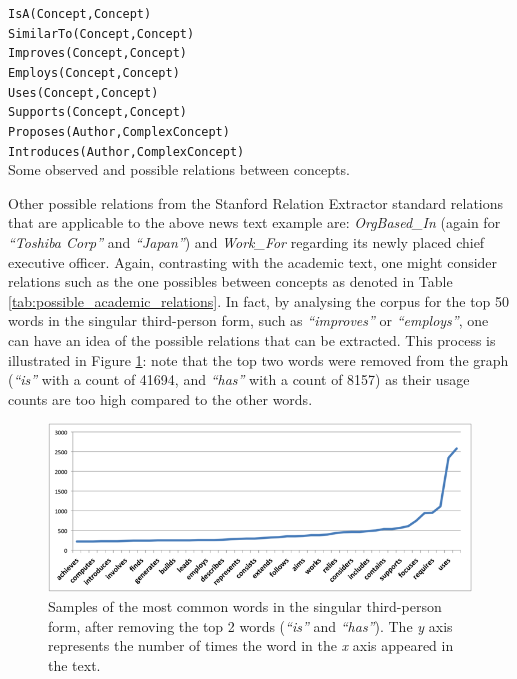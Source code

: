 \documentclass[11pt,a4paper,openright]{memoir}
\begin{document}
\begin{table}[!htbp]
  \centering
  \RaggedRight
    \texttt{IsA(Concept,Concept)} \\
    \texttt{SimilarTo(Concept,Concept)} \\
    \texttt{Improves(Concept,Concept)} \\
    \texttt{Employs(Concept,Concept)} \\
    \texttt{Uses(Concept,Concept)} \\
    \texttt{Supports(Concept,Concept)} \\
    \texttt{Proposes(Author,ComplexConcept)} \\
    \texttt{Introduces(Author,ComplexConcept)} \\
  \caption[Some observed and possible relations between concepts.]{Some observed and possible relations between concepts.}
  \label{tab:possible_academic_relations}
\end{table}

Other possible relations from the Stanford Relation Extractor standard relations that are applicable to the above news text example are: \emph{OrgBased\_In} (again for \emph{\enquote{Toshiba Corp}} and \emph{\enquote{Japan}}) and \emph{Work\_For} regarding its newly placed chief executive officer. Again, contrasting with the academic text, one might consider relations such as the one possibles between concepts as denoted in Table \ref{tab:possible_academic_relations}. In fact, by analysing the corpus for the top 50 words in the singular third-person form, such as \emph{\enquote{improves}} or \emph{\enquote{employs}}, one can have an idea of the possible relations that can be extracted. This process is illustrated in Figure \ref{fig:words_most_use_no_top2}: note that the top two words were removed from the graph (\emph{\enquote{is}} with a count of 41694, and \emph{\enquote{has}} with a count of 8157) as their usage counts are too high compared to the other words.

\begin{figure}[!htbp]
  \centering
    \includegraphics[width=1.0\textwidth]{./images/words_most_use_no_top2}
  \caption[Samples of the most common words in the singular third-person form, after removing the top 2 words.]{Samples of the most common words in the singular third-person form, after removing the top 2 words (\emph{\enquote{is}} and \emph{\enquote{has}}). The \emph{y} axis represents the number of times the word in the \emph{x} axis appeared in the text.}
  \label{fig:words_most_use_no_top2}
\end{figure}
\end{document}
